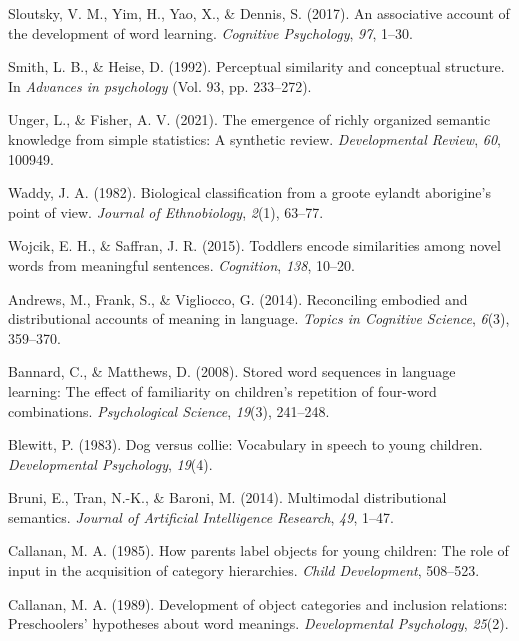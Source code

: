 \documentclass[english,,man,floatsintext]{apa6}
\begin{document}
\leavevmode\hypertarget{ref-sloutsky2017}{}%
Sloutsky, V. M., Yim, H., Yao, X., \& Dennis, S. (2017). An associative account of the development of word learning. \emph{Cognitive Psychology}, \emph{97}, 1--30.

\leavevmode\hypertarget{ref-smith1992}{}%
Smith, L. B., \& Heise, D. (1992). Perceptual similarity and conceptual structure. In \emph{Advances in psychology} (Vol. 93, pp. 233--272).

\leavevmode\hypertarget{ref-unger2021}{}%
Unger, L., \& Fisher, A. V. (2021). The emergence of richly organized semantic knowledge from simple statistics: A synthetic review. \emph{Developmental Review}, \emph{60}, 100949.

\leavevmode\hypertarget{ref-waddy1982}{}%
Waddy, J. A. (1982). Biological classification from a groote eylandt aborigine's point of view. \emph{Journal of Ethnobiology}, \emph{2}(1), 63--77.

\leavevmode\hypertarget{ref-wojcik2015}{}%
Wojcik, E. H., \& Saffran, J. R. (2015). Toddlers encode similarities among novel words from meaningful sentences. \emph{Cognition}, \emph{138}, 10--20.

\leavevmode\hypertarget{ref-andrews2014}{}%
Andrews, M., Frank, S., \& Vigliocco, G. (2014). Reconciling embodied and distributional accounts of meaning in language. \emph{Topics in Cognitive Science}, \emph{6}(3), 359--370.

\leavevmode\hypertarget{ref-bannard2008}{}%
Bannard, C., \& Matthews, D. (2008). Stored word sequences in language learning: The effect of familiarity on children's repetition of four-word combinations. \emph{Psychological Science}, \emph{19}(3), 241--248.

\leavevmode\hypertarget{ref-blewitt1983}{}%
Blewitt, P. (1983). Dog versus collie: Vocabulary in speech to young children. \emph{Developmental Psychology}, \emph{19}(4).

\leavevmode\hypertarget{ref-bruni2014}{}%
Bruni, E., Tran, N.-K., \& Baroni, M. (2014). Multimodal distributional semantics. \emph{Journal of Artificial Intelligence Research}, \emph{49}, 1--47.

\leavevmode\hypertarget{ref-callanan1985}{}%
Callanan, M. A. (1985). How parents label objects for young children: The role of input in the acquisition of category hierarchies. \emph{Child Development}, 508--523.

\leavevmode\hypertarget{ref-callanan1989}{}%
Callanan, M. A. (1989). Development of object categories and inclusion relations: Preschoolers' hypotheses about word meanings. \emph{Developmental Psychology}, \emph{25}(2).
\end{document}

